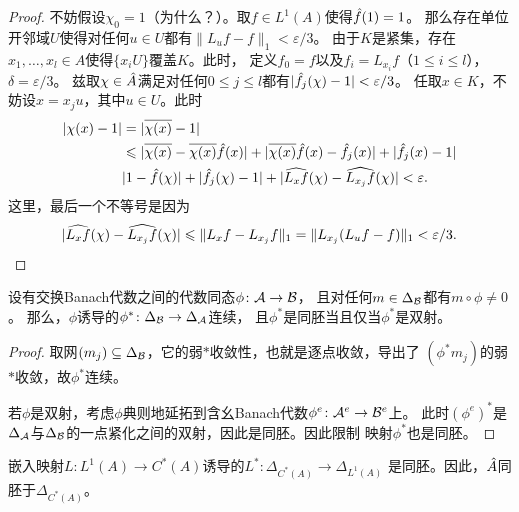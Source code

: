 \begin{proof}
    不妨假设$\chi_0 = 1$（为什么？）。取$f \in L^1(A)$使得$\hat{f}(1) = 1$。
    那么存在单位开邻域$U$使得对任何$u \in U$都有$\|L_uf - f\|_1 < \varepsilon/3$。
    由于$K$是紧集，存在$x_1,\ldots,x_l \in A$使得$\{x_iU\}$覆盖$K$。此时，
    定义$f_0 = f$以及$f_i = L_{x_i}f$（$1 \leqslant i \leqslant l$），$\delta = \varepsilon/3$。
    兹取$\chi \in \hat{A}$满足对任何$0 \leqslant j \leqslant l$都有$|\hat{f}_j(\chi) - 1| < \varepsilon/3$。
    任取$x \in K$，不妨设$x = x_ju$，其中$u \in U$。此时
    \begin{align*}
        |\chi(x)-1| & = |\overline{\chi(x)} - 1| 
        \\ & \leqslant |\overline{\chi(x)} - \overline{\chi(x)}\hat{f}(x)| + |\overline{\chi(x)}\hat{f}(x) - \hat{f}_j(x)| + |\hat{f}_j(x)-1|
        \\ & |1-\hat{f}(\chi)|+|\hat{f}_j(\chi)-1|+|\widehat{L_xf}(\chi) - \widehat{L_{x_j}f}(\chi)| < \varepsilon. 
    \end{align*}
    这里，最后一个不等号是因为
    \[|\widehat{L_xf}(\chi) - \widehat{L_{x_j}f}(\chi)| 
    \leqslant \|L_xf - L_{x_j}f\|_1 = \|L_{x_j}(L_uf - f)\|_1 
    < \varepsilon/3.\qedhere\]
\end{proof}
\begin{lemma}
    设有交换Banach代数之间的代数同态$\phi \colon \mathcal{A} \to \mathcal{B}$，
    且对任何$m \in \Delta_{\mathcal{B}}$都有$m \circ \phi \neq 0$。
    那么，$\phi$诱导的$\phi^*\colon \Delta_{\mathcal{B}} \to \Delta_{\mathcal{A}}$连续，
    且$\phi^*$是同胚当且仅当$\phi^*$是双射。
\end{lemma}
\begin{proof}
    取网$(m_j) \subseteq \Delta_{\mathcal{B}}$，它的弱$*$收敛性，也就是逐点收敛，导出了
    $(\phi^* m_j)$的弱$*$收敛，故$\phi^*$连续。

    若$\phi$是双射，考虑$\phi$典则地延拓到含幺Banach代数$\phi^e \colon \mathcal{A}^e \to \mathcal{B}^e$上。
    此时$(\phi^e)^*$是$\Delta_{\mathcal{A}}$与$\Delta_{\mathcal{B}}$的一点紧化之间的双射，因此是同胚。因此限制
    映射$\phi^*$也是同胚。
\end{proof}
\begin{theorem}
    嵌入映射$L \colon L^1(A) \to C^*(A)$诱导的$L^* \colon \Delta_{C^*(A)} \to \Delta_{L^1(A)}$
    是同胚。因此，$\hat{A}$同胚于$\Delta_{C^*(A)}$。
\end{theorem}
